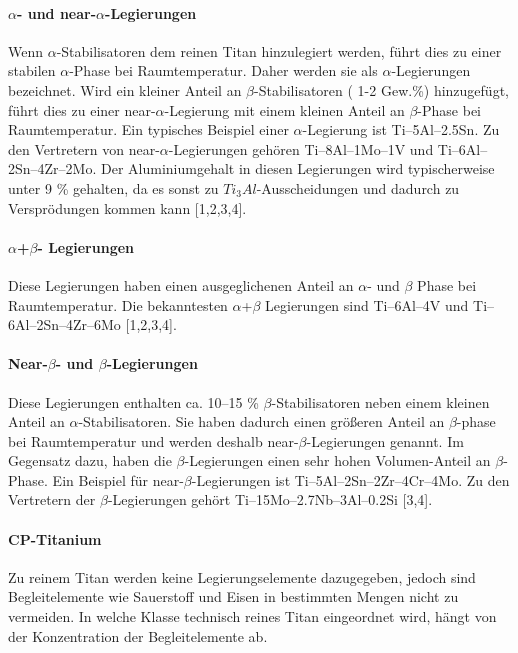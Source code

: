 \paragraph{$\alpha$- und near-$\alpha$-Legierungen}
Wenn $\alpha$-Stabilisatoren dem reinen Titan hinzulegiert werden, führt dies zu einer stabilen $\alpha$-Phase bei Raumtemperatur. Daher werden sie als $\alpha$-Legierungen bezeichnet. Wird ein kleiner Anteil an $\beta$-Stabilisatoren ( 1-2 Gew.\%) hinzugefügt, führt dies zu einer near-$\alpha$-Legierung mit einem kleinen Anteil an $\beta$-Phase bei Raumtemperatur. Ein typisches Beispiel einer $\alpha$-Legierung ist Ti–5Al–2.5Sn. Zu den Vertretern von near-$\alpha$-Legierungen gehören Ti–8Al–1Mo–1V und Ti–6Al–2Sn–4Zr–2Mo. Der Aluminiumgehalt in diesen Legierungen wird typischerweise unter 9 \% gehalten, da es sonst zu $Ti_{3}Al$-Ausscheidungen und dadurch zu Versprödungen kommen kann [1,2,3,4].

\paragraph{$\alpha$+$\beta$- Legierungen}
Diese Legierungen haben einen ausgeglichenen Anteil an $\alpha$- und $\beta$ Phase bei Raumtemperatur. Die bekanntesten $\alpha$+$\beta$ Legierungen sind Ti–6Al–4V und Ti–6Al–2Sn–4Zr–6Mo [1,2,3,4].

\paragraph{Near-$\beta$- und $\beta$-Legierungen}
Diese Legierungen enthalten ca. 10--15 \% $\beta$-Stabilisatoren neben einem kleinen Anteil an $\alpha$-Stabilisatoren. Sie haben dadurch einen größeren Anteil an $\beta$-phase bei Raumtemperatur und werden deshalb near-$\beta$-Legierungen genannt. Im Gegensatz dazu, haben die $\beta$-Legierungen einen sehr hohen Volumen-Anteil an $\beta$-Phase. Ein Beispiel für near-$\beta$-Legierungen ist Ti–5Al–2Sn–2Zr–4Cr–4Mo. Zu den Vertretern der $\beta$-Legierungen gehört Ti–15Mo–2.7Nb–3Al–0.2Si [3,4].

\paragraph{CP-Titanium} 
Zu reinem Titan werden keine Legierungselemente dazugegeben, jedoch sind Begleitelemente wie Sauerstoff und Eisen in bestimmten Mengen nicht zu vermeiden. In welche Klasse technisch reines Titan eingeordnet wird, hängt von der Konzentration der Begleitelemente ab. 


